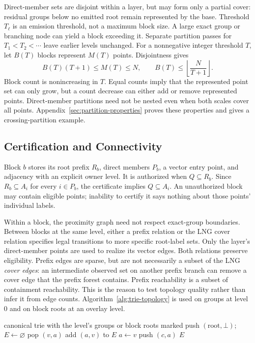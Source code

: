 Direct-member sets are disjoint within a layer, but may form only a partial
cover: residual groups below no emitted root remain represented by the base.
Threshold $T_\ell$ is an emission threshold, not a maximum block size.  A
large exact group or branching node can yield a block exceeding it.  Separate
partition passes for $T_1<T_2<\cdots$ leave earlier levels unchanged.
For a nonnegative integer threshold $T$, let $B(T)$ blocks represent $M(T)$
points. Disjointness gives
\begin{equation}
 B(T)(T+1)\le M(T)\le N,\qquad
 B(T)\le\left\lfloor\frac{N}{T+1}\right\rfloor.
 \label{eq:block-count-bound}
\end{equation}
Block count is nonincreasing in $T$. Equal counts imply that the represented
point set can only grow, but a count decrease can either add or remove
represented points. Direct-member partitions need not be nested even when
both scales cover all points. Appendix~\ref{sec:partition-properties}
proves these properties and gives a crossing-partition example.

\subsection{Certification and Connectivity}
Block $b$ stores its root prefix $R_b$, direct members $P_b$, a vector entry
point, and adjacency with an explicit owner level.  It is authorized when
$Q\subseteq R_b$.  Since $R_b\subseteq A_i$ for every $i\in P_b$, the
certificate implies $Q\subseteq A_i$.  An unauthorized block may contain
eligible points; inability to certify it says nothing about those points'
individual labels.

Within a block, the proximity graph need not respect exact-group boundaries.
Between blocks at the same level, either a prefix relation or the LNG cover
relation specifies legal transitions to more specific root-label sets.
Only the layer's direct-member points are used to realize its vector edges.
Both relations preserve eligibility.  Prefix edges are sparse, but are not
necessarily a subset of the LNG \emph{cover edges}: an intermediate observed
set on another prefix branch can remove a cover edge that the prefix forest
contains.  Prefix reachability is a subset of containment reachability.
This is the reason to test topology quality rather than infer it from edge
counts.  Algorithm~\ref{alg:trie-topology} is used on groups at level 0 and
on block roots at an overlay level.

\begin{algorithm}[t]
\caption{Terminal-prefix topology at a fixed physical level}
\label{alg:trie-topology}
\begin{algorithmic}[1]
\Require canonical trie with the level's groups or block roots marked
\State push $(\mathrm{root},\bot)$; $E\gets\varnothing$
  \State pop $(v,a)$
     \State add $(a,v)$ to $E$ \EndIf
    \State $a\gets v$
  \EndIf
   \State push $(c,a)$ \EndFor
\EndWhile
\State \Return $E$
\end{algorithmic}
\end{algorithm}

